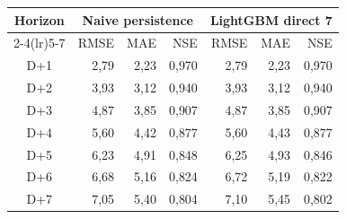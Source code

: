 \begin{tabular}{crrrrrr}
\toprule
Horizon & \multicolumn{3}{c}{Naive persistence} & \multicolumn{3}{c}{LightGBM direct 7} \\
\cmidrule(lr){2-4}\cmidrule(lr){5-7}
 & RMSE & MAE & NSE & RMSE & MAE & NSE \\
\midrule
D+1 & 2{,}79 & 2{,}23 & 0{,}970 & 2{,}79 & 2{,}23 & 0{,}970 \\
D+2 & 3{,}93 & 3{,}12 & 0{,}940 & 3{,}93 & 3{,}12 & 0{,}940 \\
D+3 & 4{,}87 & 3{,}85 & 0{,}907 & 4{,}87 & 3{,}85 & 0{,}907 \\
D+4 & 5{,}60 & 4{,}42 & 0{,}877 & 5{,}60 & 4{,}43 & 0{,}877 \\
D+5 & 6{,}23 & 4{,}91 & 0{,}848 & 6{,}25 & 4{,}93 & 0{,}846 \\
D+6 & 6{,}68 & 5{,}16 & 0{,}824 & 6{,}72 & 5{,}19 & 0{,}822 \\
D+7 & 7{,}05 & 5{,}40 & 0{,}804 & 7{,}10 & 5{,}45 & 0{,}802 \\
\bottomrule
\end{tabular}
